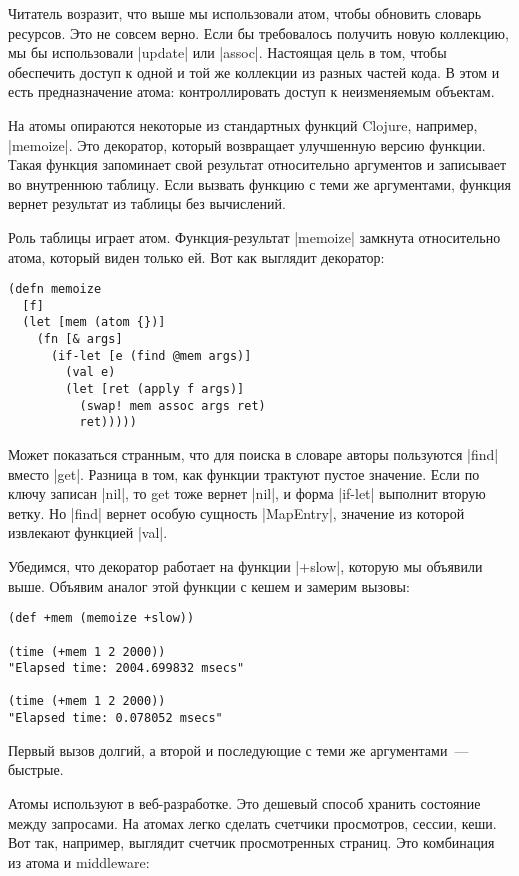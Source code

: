 Читатель возразит, что выше мы использовали атом, чтобы обновить словарь
ресурсов. Это не совсем верно. Если бы требовалось получить новую коллекцию, мы
бы использовали \spverb|update| или \spverb|assoc|. Настоящая цель в том, чтобы обеспечить
доступ к одной и той же коллекции из разных частей кода. В этом и есть
предназначение атома: контроллировать доступ к неизменяемым объектам.

На атомы опираются некоторые из стандартных функций Clojure, например,
\spverb|memoize|. Это декоратор, который возвращает улучшенную версию функции. Такая
функция запоминает свой результат относительно аргументов и записывает во
внутреннюю таблицу. Если вызвать функцию с теми же аргументами, функция вернет
результат из таблицы без вычислений.

Роль таблицы играет атом. Функция-результат \spverb|memoize| замкнута относительно
атома, который виден только ей. Вот как выглядит декоратор:

\begin{verbatim}
(defn memoize
  [f]
  (let [mem (atom {})]
    (fn [& args]
      (if-let [e (find @mem args)]
        (val e)
        (let [ret (apply f args)]
          (swap! mem assoc args ret)
          ret)))))
\end{verbatim}

Может показаться странным, что для поиска в словаре авторы пользуются \spverb|find|
вместо \spverb|get|. Разница в том, как функции трактуют пустое значение. Если по ключу
записан \spverb|nil|, то get тоже вернет \spverb|nil|, и форма \spverb|if-let| выполнит вторую
ветку. Но \spverb|find| вернет особую сущность \spverb|MapEntry|, значение из которой
извлекают функцией \spverb|val|.

Убедимся, что декоратор работает на функции \spverb|+slow|, которую мы объявили
выше. Объявим аналог этой функции с кешем и замерим вызовы:

\begin{verbatim}
(def +mem (memoize +slow))

(time (+mem 1 2 2000))
"Elapsed time: 2004.699832 msecs"

(time (+mem 1 2 2000))
"Elapsed time: 0.078052 msecs"
\end{verbatim}

Первый вызов долгий, а второй и последующие с теми же аргументами~--- быстрые.

Атомы используют в веб-разработке. Это дешевый способ хранить состояние между
запросами. На атомах легко сделать счетчики просмотров, сессии, кеши. Вот так,
например, выглядит счетчик просмотренных страниц. Это комбинация из атома и
middleware:

